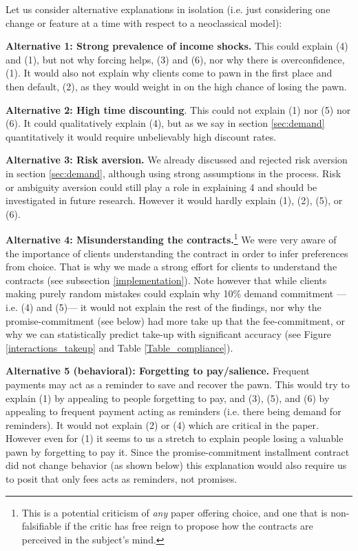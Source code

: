 \documentclass[oneside,11pt]{article}
\begin{document}
Let us consider alternative explanations in isolation (i.e. just considering one change or feature at a time with respect to a neoclassical model):

\vspace{.1in}
\noindent \textbf{Alternative 1: Strong prevalence of income shocks.} This could explain (4) and (1), but not why forcing helps, (3) and (6), nor why there is overconfidence, (1). It would also not explain why clients come to pawn in the first place and then default, (2), as they would weight in on the high chance of losing the pawn. 

\vspace{.1in}
\noindent \textbf{Alternative 2: High time discounting}. This could not explain (1) nor (5) nor (6). It could qualitatively explain (4), but as we say in section \ref{sec:demand} quantitatively it would require unbelievably high discount rates.


\vspace{.1in}
\noindent \textbf{Alternative 3: Risk aversion.} We already discussed and rejected risk aversion in section \ref{sec:demand}, although using strong assumptions in the process. Risk or ambiguity aversion could still play a role in explaining 4 and should be investigated in future research. However it would hardly explain (1), (2), (5), or (6).

\vspace{.1in}
\noindent \textbf{Alternative 4: Misunderstanding the contracts.}\footnote{This is a potential criticism of \textit{any} paper offering choice, and one that is non-falsifiable if the critic has free reign to propose how the contracts are perceived in the subject's mind.} We were very aware of the importance of clients understanding the contract in order to infer preferences from choice. That is why we made a strong effort for clients to understand the contracts (see subsection \ref{implementation}). Note however that while clients making purely random mistakes could explain why 10\% demand commitment ---i.e. (4) and (5)--- it would not explain the rest of the findings, nor why the promise-commitment (see below) had more take up that the fee-commitment, or why we can statistically predict take-up with significant accuracy (see Figure \ref{interactions_takeup} and Table \ref{Table_compliance}).

\vspace{.1in}
\noindent \textbf{Alternative 5 (behavioral): Forgetting to pay/salience.} Frequent payments may act as a reminder to save and recover the pawn. This would try to explain (1) by appealing to people forgetting to pay, and (3), (5), and (6) by appealing to frequent payment acting as reminders (i.e. there being demand for reminders). It would not explain (2) or (4) which are critical in the paper. However even for (1) it seems to us a stretch to explain people losing a valuable pawn by forgetting to pay it. Since the promise-commitment installment contract did not change behavior (as shown below) this explanation would also require us to posit that only fees acts as reminders, not promises.
\end{document}
